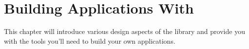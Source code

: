 \chapter{Building Applications With }

This chapter will introduce various design aspects of the library and
provide you with the tools you'll need to build your own 
applications.






